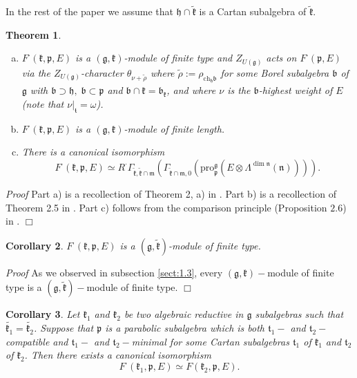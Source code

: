 \documentclass[default]{./styles/svmult}
\newtheorem{theo}{Theorem}[section]
\newtheorem{cor}[theo]{Corollary}
\renewenvironment{proof}{ \emph{Proof}}{$\Box$}
\newcommand{\ch}{\mathrm{ch}}
\newcommand{\pro}{\mathrm{pro}}
\newcommand{\bb}{\mathfrak{b}}
\renewcommand{\gg}{\mathfrak{g}}
\newcommand{\hh}{\mathfrak{h}}
\newcommand{\kk}{\mathfrak{k}}
\newcommand{\mm}{\mathfrak{m}}
\newcommand{\nn}{\mathfrak{n}}
\newcommand{\pp}{\mathfrak{p}}
\renewcommand{\tt}{\mathfrak{t}}
\begin{document}
In the rest of the paper we assume that $\hh \cap \tilde{\kk}$ is a Cartan subalgebra of $\tilde{\kk}$.

\begin{theo}\label{th:3}
    \begin{enumerate}[a)]
		\item $F^\cdot(\kk,\pp,E)$ is a $(\gg,\kk)$-module of finite type and $Z_{U(\gg)}$ acts on $F^\cdot(\pp,E)$ via the $Z_{U(\gg)}$-character $\theta_{\nu+\tilde{\rho}}$ where $\tilde{\rho}:=\rho_{\ch_\hh\bb}$ for some Borel subalgebra $\bb$ of $\gg$ with $\bb\supset\hh,\;\bb\subset\pp$ and $\bb\cap\kk=\bb_\kk$, and where $\nu$ is the $\bb$-highest weight of $E$ (note that $\nu|_\tt=\omega$).
		\item $F^\cdot(\kk,\pp,E)$ is a $(\gg,\kk)$-module of finite length.
		\item There is a canonical isomorphism
		\begin{equation}\label{eq1}
		    F^\cdot(\kk,\pp,E)\simeq R^\cdot\Gamma_{\tilde{\kk},\tilde{\kk}\cap\mm}(\Gamma_{\tilde{\kk}\cap\mm,0}(\pro_\pp^\gg (E\otimes \Lambda^{\dim \nn}(\nn)))).
		\end{equation}
    \end{enumerate}
\end{theo}

\begin{proof}
	Part a) is a recollection of Theorem 2, a) in \cite{PZ2}. Part b) is a recollection of Theorem 2.5 in \cite{PZ5}. Part c) follows from the comparison principle (Proposition $2.6$) in \cite{PZ4}.
\end{proof}

\begin{cor}\label{corr:3}
    $F^\cdot(\kk,\pp,E)$ is a $(\gg,\tilde{\kk})$-module of finite type.
\end{cor}

\begin{proof}
    As we observed in subsection \ref{sect:1.3}, every $(\gg,\kk)-$module of finite type is a $(\gg,\tilde{\kk})-$module of finite type.
\end{proof}

\begin{cor}\label{corr:4}
    Let $\kk_1$ and $\kk_2$ be two algebraic reductive in $\gg$ subalgebras such that $\tilde{\kk_1}=\tilde{\kk_2}$. Suppose that $\pp$ is a parabolic subalgebra which is both $\tt_1-$ and $\tt_2-$compatible and  $\tt_1-$ and $\tt_2-$minimal for some Cartan subalgebras $\tt_1$ of $\kk_1$ and $\tt_2$ of $\kk_2$. Then there exists a canonical isomorphism
	$$F^\cdot(\kk_1,\pp,E)\simeq F(\kk_2,\pp,E).$$
\end{cor}
\end{document}
